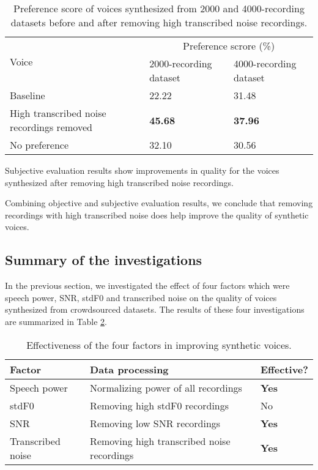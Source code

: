\documentclass[12pt]{article}
\begin{document}
\begin{table}[]
\begin{center}
\caption{Preference score of voices synthesized from 2000 and 4000-recording datasets before and after removing high transcribed noise recordings.}
\label{tab_subEvaTranscribedNoise}
\vspace{3mm}
\begin{tabular}{|l|m{2.8cm}|m{2.8cm}|}
\hline
\multirow{2}{4cm}{Voice} &
\multicolumn{2}{c|}{Preference scrore (\%)} \\ \cline{2-3}
& 2000-recording dataset & 4000-recording dataset \\
\hline
Baseline & 22.22 & 31.48 \\
High transcribed noise recordings removed & \textbf{45.68} & \textbf{37.96} \\
No preference & 32.10 & 30.56 \\
\hline
\end{tabular}
\end{center}
\end{table}

Subjective evaluation results show improvements in quality for the voices synthesized after removing high transcribed noise recordings.

Combining objective and subjective evaluation results, we conclude that removing recordings with high transcribed noise does help improve the quality of synthetic voices.

\subsection{Summary of the investigations}
In the previous section, we investigated the effect of four factors which were speech power, SNR, stdF0 and transcribed noise on the quality of voices synthesized from crowdsourced datasets. The results of these four investigations are summarized in Table \ref{tab_investigationsSummary}.

\begin{table}[]
\begin{center}
\caption{Effectiveness of the four factors in improving synthetic voices.}
\label{tab_investigationsSummary}
\vspace{3mm}
\begin{tabular}{|m{3.2cm}|m{8cm}|m{1.8cm}|}
\hline
Factor & Data processing & Effective? \\
\hline
Speech power & Normalizing power of all recordings & \textbf{Yes} \\
stdF0 & Removing high stdF0 recordings & No \\
SNR & Removing low SNR recordings & \textbf{Yes} \\
Transcribed noise & Removing high transcribed noise recordings & \textbf{Yes} \\
\hline
\end{tabular}
\end{center}
\end{table}
\end{document}
